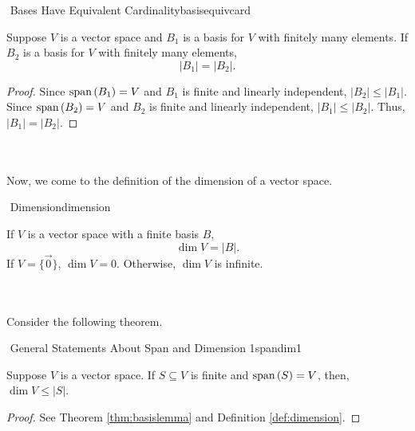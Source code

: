         \begin{theorem}{\Stop\,\,Bases Have Equivalent Cardinality}{basisequivcard}

            Suppose \(V\) is a vector space and \(B_1\) is a basis for \(V\) with finitely many elements. If \(B_2\) is a basis for \(V\) with finitely many elements,
            \begin{equation*}
                |B_1|=|B_2|.
            \end{equation*}
            \begin{proof}
                Since \(\text{span\,}(B_1)=V\) and \(B_1\) is finite and linearly independent, \(|B_2|\leq|B_1|\). Since \(\text{span\,}(B_2)=V\) and \(B_2\) is finite and linearly independent, \(|B_1|\leq|B_2|\). Thus, \(|B_1|=|B_2|\).
            \end{proof}
            
        \end{theorem}
        \vphantom
        \\
        \\
        Now, we come to the definition of the dimension of a vector space.
        \begin{definition}{\Stop\,\,Dimension}{dimension}

            If \(V\) is a vector space with a finite basis \(B\),
            \begin{equation*}
                \dim V = |B|.
            \end{equation*}
            If \(V=\{\vec{0}\}\), \(\dim V=0\). Otherwise, \(\dim V\) is infinite.
            
        \end{definition}
        \vphantom
        \\
        \\
        Consider the following theorem.
        \begin{theorem}{\Stop\,\,General Statements About Span and Dimension 1}{spandim1}
            
            Suppose \(V\) is a vector space. If \(S\subseteq V\) is finite and \(\text{span\,}(S)=V\), then, \(\dim V\leq|S|\).
            \begin{proof}
                See Theorem \ref{thm:basislemma} and Definition \ref{def:dimension}.
            \end{proof}

        \end{theorem}
